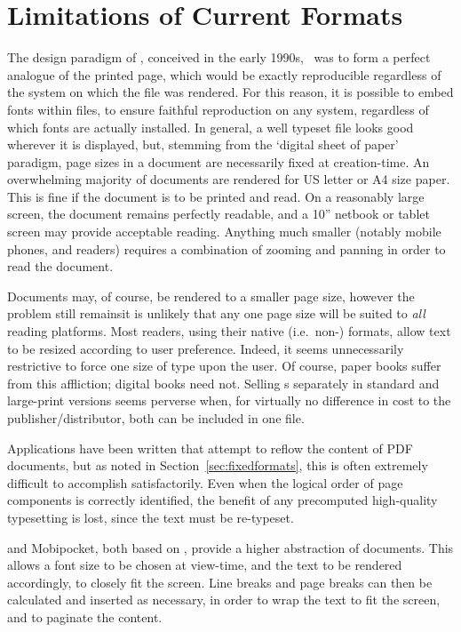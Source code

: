 \section{Limitations of Current Formats}

The design paradigm of \pdf{}, conceived in the early 1990s,~\cite{Warnock1991} was to form a perfect analogue of the printed page, which would be exactly reproducible regardless of the system on which the file was rendered. For this reason, it is possible to embed fonts within \pdf{} files, to ensure faithful reproduction on any system, regardless of which fonts are actually installed. In general, a well typeset \pdf{} file looks good wherever it is displayed, but, stemming from the `digital sheet of paper' paradigm, page sizes in a \pdf{} document are necessarily fixed at creation-time. An overwhelming majority of \pdf{} documents are rendered for  US letter or A4 size paper. This is fine if the document is to be printed and read. On a reasonably large screen, the document remains perfectly readable, and a 10'' netbook or tablet screen may provide acceptable reading. Anything much smaller (notably mobile phones, and \ebook{} readers) requires a combination of zooming and panning  in order to read the document.

Documents may, of course, be rendered to a smaller page size, however the problem still remains\ed it is unlikely that any one page size will be suited to \emph{all} reading platforms. Most \ebook{} readers, using their native (i.e.\ non-\pdf{}) formats, allow text to be resized according to user preference. Indeed, it seems unnecessarily restrictive to force one size of type upon the user. Of course, paper books suffer from this affliction; digital books need not. Selling \ebook{}s separately in standard and large-print versions seems perverse when, for virtually no difference in cost to the publisher/distributor, both can be included in one file.

Applications have been written that attempt to reflow the content of PDF documents, but as noted in Section~\ref{sec:fixedformats}, this is often extremely difficult to accomplish satisfactorily. Even when the logical order of page components is correctly identified, the benefit of any precomputed high-quality typesetting is lost, since the text must be re-typeset.



\epub{} and Mobipocket, both based on \html{}, provide a higher abstraction of documents. This allows a font size to be chosen at view-time, and the text to be rendered accordingly, to closely fit the screen. Line breaks and page breaks can then be calculated and inserted as necessary, in order to wrap the text to fit the screen, and to paginate the content.

